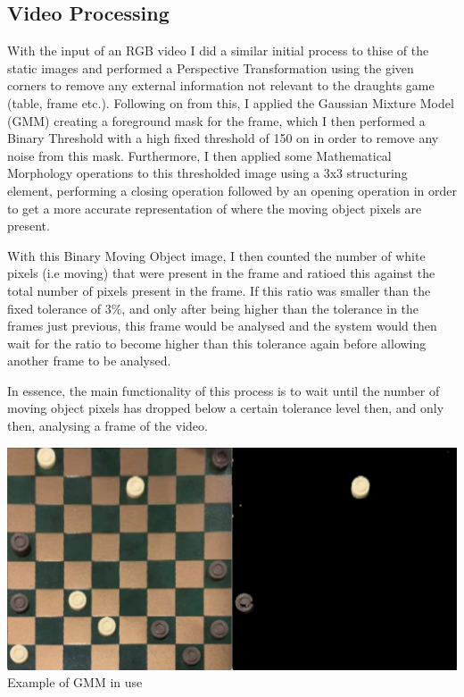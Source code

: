 \documentclass[12pt]{article}
\begin{document}
    \subsection{Video Processing}
    \par
    With the input of an RGB video I did a similar initial process to thise of the static images and performed a Perspective Transformation using the given corners to remove any external information not relevant to the
    draughts game (table, frame etc.). Following on from this, I applied the Gaussian Mixture Model (GMM) creating a foreground mask for the frame, which I then performed a Binary Threshold with a high fixed threshold of 150 on
    in order to remove any noise from this mask. Furthermore, I then applied some Mathematical Morphology operations to this thresholded image using a 3x3 structuring element, performing a closing operation followed by an opening
    operation in order to get a more accurate representation of where the moving object pixels are present.
    \par
    With this Binary Moving Object image, I then counted the number of white pixels (i.e moving) that were present in the frame and ratioed this against the total number of pixels present in the frame. If this ratio was smaller than
    the fixed tolerance of 3\%, and only after being higher than the tolerance in the frames just previous, this frame would be analysed and the system would then wait for the ratio to become higher than this tolerance again before allowing
    another frame to be analysed.
    \par
    In essence, the main functionality of this process is to wait until the number of moving object pixels has dropped below a certain tolerance level then, and only then, analysing a frame of the video.
    \begin{center}
        \includegraphics[scale=0.21]{GMMEg.png}
        \newline
        Example of GMM in use
    \end{center}
\end{document}
